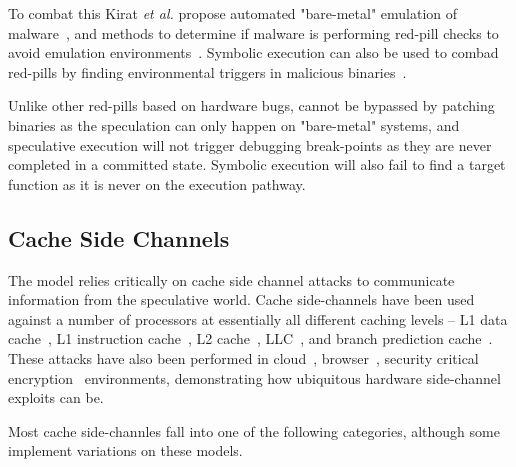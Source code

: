 To combat this Kirat \textit{et al.} propose automated "bare-metal" 
emulation of malware~\cite{kirat2011barebox}, and methods to determine if malware
is performing red-pill checks to avoid emulation environments~\cite{kirat2014barecloud}.
Symbolic execution can also be used to combad red-pills by finding environmental triggers 
in malicious binaries~\cite{schwartz2010all}. 

\smallskip

Unlike other red-pills based on hardware bugs, \speculake cannot be bypassed
by patching binaries as the speculation can only happen on "bare-metal" systems, 
and speculative execution will not trigger debugging break-points as 
they are never completed in a committed state.
Symbolic execution will also fail to find a target function as it is never on the 
execution pathway. 



\subsection{Cache Side Channels}

The \speculake model relies critically on cache side channel attacks to 
communicate information from the speculative world. Cache side-channels have 
been used against a number of processors at essentially all different 
caching levels -- L1 data cache~\cite{percival2005cache,zhang2012cross,osvik2006cache}, 
L1 instruction cache~\cite{aciiccmez2010new}, 
L2 cache~\cite{ristenpart2009hey,percival2005cache}, 
LLC~\cite{ristenpart2009hey,liu2015last}, 
and branch prediction cache~\cite{aciiccmez2007power}. 
These attacks have also been performed in 
cloud~\cite{ristenpart2009hey,zhang2012cross}, 
browser~\cite{oren2015spy,google_cache_browser},
security critical encryption~\cite{yarom2014recovering,tromer2010efficient}
environments, demonstrating how ubiquitous hardware side-channel exploits can be. 

Most cache side-channles fall into one of the following categories, although
some implement variations on these models.

